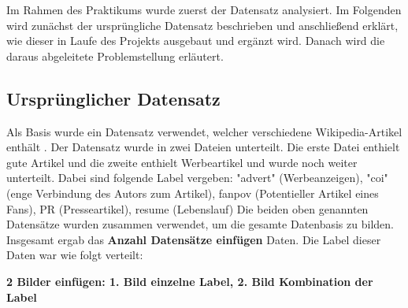 
Im Rahmen des Praktikums wurde zuerst der Datensatz analysiert. Im Folgenden wird zunächst der ursprüngliche Datensatz beschrieben und anschließend erklärt, wie dieser in Laufe des Projekts ausgebaut und ergänzt wird. Danach wird die daraus abgeleitete Problemstellung erläutert.

\subsection{Ursprünglicher Datensatz}
\label{UrsprunglicherDatensatz}
Als Basis wurde ein Datensatz verwendet, welcher  verschiedene Wikipedia-Artikel enthält \cite{Urbanbricks2020}. Der Datensatz wurde in zwei Dateien unterteilt. Die erste Datei enthielt gute Artikel und die zweite enthielt %
Werbeartikel und wurde noch weiter unterteilt. Dabei sind folgende Label vergeben: "advert" (Werbeanzeigen), "coi" (enge Verbindung des Autors zum Artikel), fanpov (Potentieller Artikel eines Fans), PR  (Presseartikel), resume (Lebenslauf)
Die beiden oben genannten Datensätze wurden zusammen verwendet, um die gesamte Datenbasis zu bilden. Insgesamt ergab das \textbf{Anzahl Datensätze einfügen} Daten. Die Label dieser Daten war wie folgt verteilt:


\textbf{2 Bilder einfügen: 1. Bild einzelne Label, 2. Bild Kombination der Label}
\\



